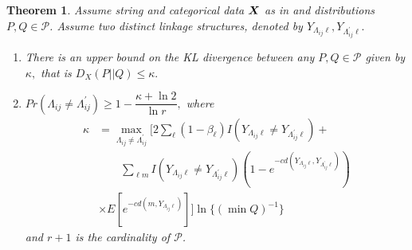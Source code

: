 \documentclass[a0paper,portrait,margin=0pt, colspace=24pt,subcolspace=0pt,blockverticalspace=36pt,innermargin=50pt]{tikzposter}
\newtheorem{theorem}{Theorem}
\begin{document}
\begin{columns}
{\begin{theorem}
\label{theorem:string}
Assume string and categorical data $\bm{X}$ as in \cite{steorts15entity} and distributions $P,Q \in \mathcal{P}$.  Assume two distinct linkage structures, denoted by $Y_{\Lambda_{ij}\ell}, Y_{\Lambda^\prime_{ij}\ell}.$
\begin{enumerate}
\item [i)] There is an upper bound on the KL divergence between any $P,Q \in \mathcal{P}$ 
given by $\kappa,$ that is $D_X(P||Q) \leq \kappa.$
\item [ii)] $Pr(\Lambda_{ij} \neq \Lambda^\prime_{ij}) \geq 1- \dfrac{\kappa + \ln 2}{\ln r},$
where 
\begin{align*}
\kappa &= \max_{\Lambda_{ij} \neq \Lambda^\prime_{ij}}\bigg[
2 \sum_{\ell} (1-\beta_\ell) I(Y_{\Lambda_{ij}\ell} \neq Y_{\Lambda^\prime_{ij}\ell}) 
  +  \\
& \qquad \sum_{\ell m}  I(Y_{\Lambda_{ij}\ell} \neq Y_{\Lambda^\prime_{ij}\ell}) 
 \left(
1 - e^{-c d(Y_{\Lambda_{ij}\ell}, Y_{\Lambda^\prime_{ij}\ell})}
\right) \\
&\times E[ e^{-c  d(m, Y_{\Lambda_{ij}\ell})} ] \bigg]\ln\{ (\min Q)^{-1} \}
\end{align*}
and $r+1$ is the cardinality of $\mathcal{P}$.
\end{enumerate}
\end{theorem}


}
\end{columns}
\end{document}
